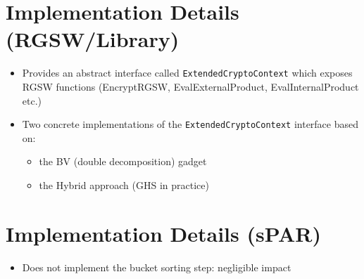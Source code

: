 \section{Implementation Details (RGSW/Library)}
\label{sec:impl:lib}
\begin{itemize}
    \item Provides an abstract interface called \texttt{ExtendedCryptoContext} which exposes RGSW functions (EncryptRGSW, EvalExternalProduct, EvalInternalProduct etc.)
    \item Two concrete implementations of the \texttt{ExtendedCryptoContext} interface based on:
    \begin{itemize}
        \item the BV (double decomposition) gadget
        \item the Hybrid approach (GHS in practice)
    \end{itemize} 
\end{itemize}


\newpage



\section{Implementation Details (sPAR)}
\begin{itemize}
    \item Does not implement the bucket sorting step: negligible impact 
\end{itemize}
